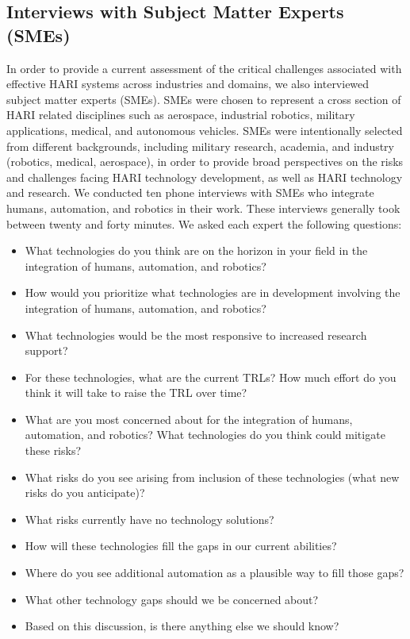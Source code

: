 \subsection{Interviews with Subject Matter Experts (SMEs)}
In order to provide a current assessment of the critical challenges associated with effective HARI systems across industries and domains, we also interviewed subject matter experts (SMEs).
SMEs were chosen to represent a cross section of HARI related disciplines such as aerospace, industrial robotics, military applications, medical, and autonomous vehicles.
SMEs were intentionally selected from different backgrounds, including military research, academia, and industry (robotics, medical, aerospace), in order to provide broad perspectives on the risks and challenges facing HARI technology development, as well as HARI technology and research.
We conducted ten phone interviews with SMEs who integrate humans, automation, and robotics in their work.
These interviews generally took between twenty and forty minutes.
We asked each expert the following questions:
\begin{itemize}
	\item What technologies do you think are on the horizon in your field in the integration of humans, automation, and robotics?
	\item How would you prioritize what technologies are in development involving the integration of humans, automation, and robotics?
	\item What technologies would be the most responsive to increased research support?
	\item For these technologies, what are the current TRLs? How much effort do you think it will take to raise the TRL over time?
	\item What are you most concerned about for the integration of humans, automation, and robotics? What technologies do you think could mitigate these risks?
	\item What risks do you see arising from inclusion of these technologies (what new risks do you anticipate)?
	\item What risks currently have no technology solutions?
	\item How will these technologies fill the gaps in our current abilities?
	\item Where do you see additional automation as a plausible way to fill those gaps?
	\item What other technology gaps should we be concerned about?
	\item Based on this discussion, is there anything else we should know?
\end{itemize}


